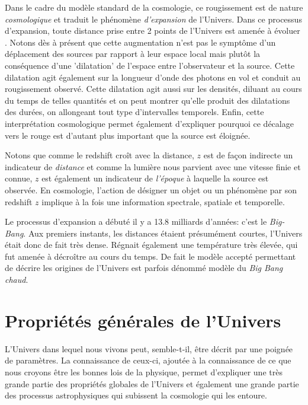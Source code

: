Dans le cadre du modèle standard de la cosmologie, ce rougissement est de nature \textit{cosmologique} et traduit le phénomène \textit{d'expansion} de l'Univers. Dans ce processus d'expansion, toute distance prise entre 2 points de l'Univers est amenée à évoluer . Notons dès à présent que cette augmentation n'est pas le symptôme d'un déplacement des sources par rapport à leur espace local mais plutôt la conséquence d'une 'dilatation' de l'espace entre l'observateur et la source. Cette dilatation agit également sur la longueur d'onde des photons en vol et conduit au rougissement observé. Cette dilatation agit aussi sur les densités, diluant au cours du temps de telles quantités et on peut montrer qu'elle produit des dilatations des durées, on allongeant tout type d'intervalles temporels. Enfin, cette interprétation cosmologique permet également d'expliquer pourquoi ce décalage vers le rouge est d'autant plus important que la source est éloignée.

Notons que comme le redshift croît avec la distance, $z$ est de façon indirecte un indicateur de \textit{distance} et comme la lumière nous parvient avec une vitesse finie et connue, $z$ est également un indicateur de \textit{l'époque} à laquelle la source est observée. En cosmologie, l'action de désigner un objet ou un phénomène par son redshift $z$ implique à la fois une information spectrale, spatiale et temporelle.

Le processus d'expansion a débuté il y a 13.8 milliards d'années: c'est le \textit{Big-Bang}. Aux premiers instants, les distances étaient présumément courtes, l'Univers était donc de fait très dense. Régnait également une température très élevée, qui fut amenée à décroître au cours du temps. De fait le modèle accepté permettant de décrire les origines de l'Univers est parfois dénommé modèle du \textit{Big Bang chaud}.

\section{Propriétés générales de l'Univers}
L'Univers dans lequel nous vivons peut, semble-t-il, être décrit par une poignée de paramètres. La connaissance de ceux-ci, ajoutée à la connaissance de ce que nous croyons être les bonnes lois de la physique, permet d'expliquer une très grande partie des propriétés globales de l'Univers et également une grande partie des processus astrophysiques qui subissent la cosmologie qui les entoure.  

